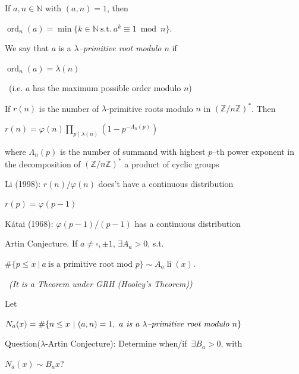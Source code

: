 \documentclass[landscape]{powersem} %
\newcommand{\Z}{{\mathbb Z}}
\newcommand{\N}{{\mathbb N}}
\newcommand{\li}{\operatorname{li}}
\newcommand{\matitablu}{\textcolor{MidnightBlue}{\ding{46}}}
\newcommand{\heading}[1]{%
 \begin{center}
  \large\bf
  \shadowbox{{\textcolor{conceptcolor}{#1}}}%
 \end{center}
 \vspace{1ex minus 1ex}}
\begin{document}
\begin{slide}
\heading{$\lambda$-analogue of the Artin Conjecture 1/3}\vspace{-2mm}\pause

\matitablu If $a,n\in\N$ with $(a,n)=1$, then
\centerline{$\displaystyle{\operatorname{ord}_n(a)=\min\{k\in\N\ \text{s.t.}\ a^k\equiv1\bmod n\}.}$}\pause

\matitablu We say that $a$ is a \emph{$\lambda$--primitive root modulo $n$} if
\centerline{$\displaystyle{\operatorname{ord}_n(a)=\lambda(n)}$}\pause
\ \hfill (i.e. $a$ has the maximum possible order modulo $n$)\pause

\matitablu If $r(n)$ is the number of $\lambda$-primitive roots modulo $n$ in $(\Z/n\Z)^*$. Then
\centerline{$\displaystyle{r(n)=\varphi(n)\prod_{p\mid \lambda(n)}\left(1-{p^{-\Lambda_n(p)}}\right)}$}\pause
where $\Lambda_n(p)$ is the number of summand with highest $p$--th power exponent in the
decomposition of $(\Z/n\Z)^*$ a product of cyclic groups\pause

\matitablu \textcolor{OliveGreen}{Li} (1998): $r(n)/\varphi(n)$ does't have a continuous distribution\pause

\matitablu $r(p)=\varphi(p-1)$\pause

\matitablu \textcolor{OliveGreen}{K\'atai} (1968): $\varphi(p-1)/(p-1)$ has a continuous distribution
\end{slide}

\begin{slide}
\heading{$\lambda$-analogue of the Artin Conjecture 2/3}\pause

\matitablu \textcolor{BurntOrange}{Artin Conjecture}. If $a\neq\square,\pm1$, $\exists A_a>0$, s.t.
\bigskip

\centerline{$\displaystyle{\#\{p\leq x\ |\ a\ \text{is a primitive root mod }p\}\sim A_a\li(x).}$}\pause
\ \hfill\emph{(It is a Theorem under GRH (Hooley's Theorem))}\pause

\matitablu Let\bigskip

\centerline{$\displaystyle{N_a(x)=\#\{n\leq x\ |\ (a,n)=1,\ a \emph{ is a $\lambda$--primitive root modulo $n$}\}}$}\pause

\matitablu Question(\textcolor{BurntOrange}{$\lambda$-Artin Conjecture}): Determine when/if\ $\exists B_a>0$, with
\bigskip

\centerline{$\displaystyle{N_a(x)\sim B_a x}$?}
\end{slide}
\end{document}
